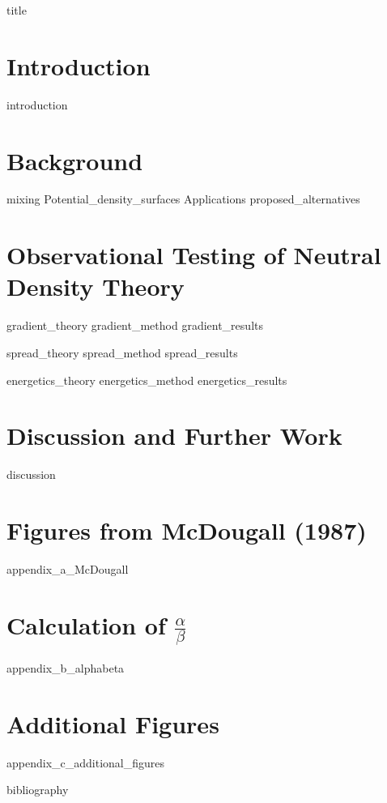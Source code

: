 \documentclass[12pt,twoside]{report}
\begin{document}
{title}


\chapter{Introduction}
{introduction}

\chapter{Background}
{mixing}
{Potential_density_surfaces}
{Applications}
{proposed_alternatives}


\chapter{Observational Testing of Neutral Density Theory}

{gradient_theory}
{gradient_method}
{gradient_results}

{spread_theory}
{spread_method}
{spread_results}

{energetics_theory}
{energetics_method}
{energetics_results}

\chapter{Discussion and Further Work}
{discussion}

\appendix
\chapter{Figures from McDougall (1987)}
{appendix_a_McDougall}
\chapter{Calculation of $\frac{\alpha}{\beta}$}
{appendix_b_alphabeta}
\chapter{Additional Figures}
{appendix_c_additional_figures}

{bibliography}
\end{document}
